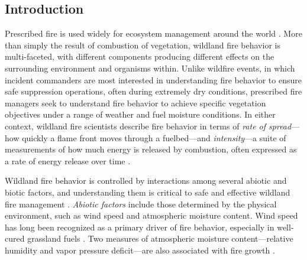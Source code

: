 \documentclass[referee, 
		     sn-basic]{sn-jnl}
\begin{document}

\maketitle
\begin{linenumbers}

\hypertarget{introduction}{%
\section{Introduction}\label{introduction}}

Prescribed fire is used widely for ecosystem management around the world \citep{weir2022}. 
More than simply the result of combustion of vegetation, wildland fire behavior is multi-faceted, with different components producing different effects on the surrounding environment and organisms within. 
Unlike wildfire events, in which incident commanders are most interested in understanding fire behavior to ensure safe suppression operations, often during extremely dry conditions, prescribed fire managers seek to understand fire behavior to achieve specific vegetation  objectives under a range of weather and fuel moisture conditions. 
In either context, wildland fire scientists describe fire behavior in terms of \emph{rate of spread}---how quickly a flame front moves through a fuelbed---and \emph{intensity}---a suite of measurements of how much energy is released by combustion, often expressed as a rate of energy release over time \citep{mcgranahan2021a}.

Wildland fire behavior is controlled by interactions among several
abiotic and biotic factors, and understanding them is critical to safe
and effective wildland fire management \citep{benson2009}. \emph{Abiotic
factors} include those determined by the physical environment, such as
wind speed and atmospheric moisture content. Wind speed has long been
recognized as a primary driver of fire behavior, especially in
well-cured grassland fuels
\citep{whittaker1961, cheney1995, kidnie2015}. Two measures of
atmospheric moisture content---relative humidity and vapor pressure
deficit---are also associated with fire growth
\citep{evett2008, reid2010, sedano2014}.


\end{linenumbers}
\end{document}
